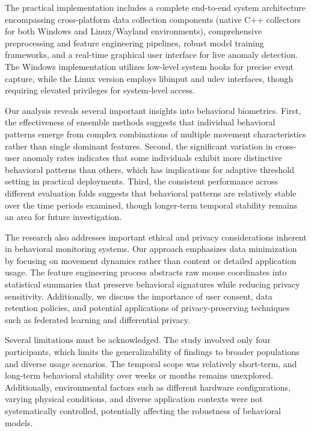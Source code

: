 \documentclass[
  12pt,
  a4paper,
]{report}
\begin{document}
The practical implementation includes a complete end-to-end system
architecture encompassing cross-platform data collection components
(native C++ collectors for both Windows and Linux/Wayland environments),
comprehensive preprocessing and feature engineering pipelines, robust
model training frameworks, and a real-time graphical user interface for
live anomaly detection. The Windows implementation utilizes low-level
system hooks for precise event capture, while the Linux version employs
libinput and udev interfaces, though requiring elevated privileges for
system-level access.

Our analysis reveals several important insights into behavioral
biometrics. First, the effectiveness of ensemble methods suggests that
individual behavioral patterns emerge from complex combinations of
multiple movement characteristics rather than single dominant features.
Second, the significant variation in cross-user anomaly rates indicates
that some individuals exhibit more distinctive behavioral patterns than
others, which has implications for adaptive threshold setting in
practical deployments. Third, the consistent performance across
different evaluation folds suggests that behavioral patterns are
relatively stable over the time periods examined, though longer-term
temporal stability remains an area for future investigation.

The research also addresses important ethical and privacy considerations
inherent in behavioral monitoring systems. Our approach emphasizes data
minimization by focusing on movement dynamics rather than content or
detailed application usage. The feature engineering process abstracts
raw mouse coordinates into statistical summaries that preserve
behavioral signatures while reducing privacy sensitivity. Additionally,
we discuss the importance of user consent, data retention policies, and
potential applications of privacy-preserving techniques such as
federated learning and differential privacy.

Several limitations must be acknowledged. The study involved only four
participants, which limits the generalizability of findings to broader
populations and diverse usage scenarios. The temporal scope was
relatively short-term, and long-term behavioral stability over weeks or
months remains unexplored. Additionally, environmental factors such as
different hardware configurations, varying physical conditions, and
diverse application contexts were not systematically controlled,
potentially affecting the robustness of behavioral models.
\end{document}
